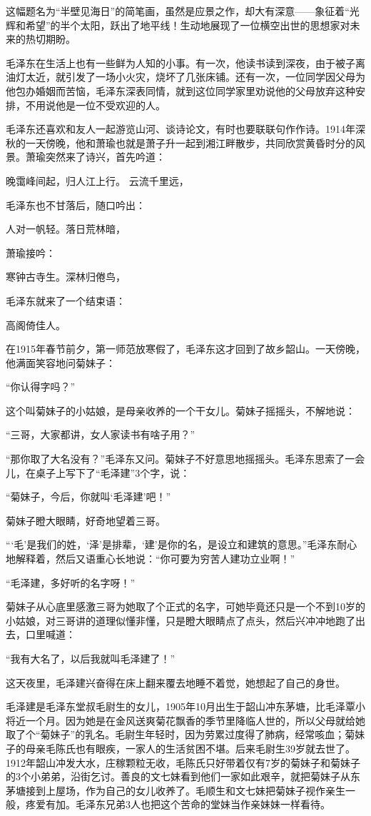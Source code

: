 \documentclass[../../dazhuan.tex]{subfiles}
\begin{document}
这幅题名为“半壁见海日”的简笔画，虽然是应景之作，却大有深意——象征着“光辉和希望”的半个太阳，跃出了地平线！生动地展现了一位横空出世的思想家对未来的热切期盼。

毛泽东在生活上也有一些鲜为人知的小事。有一次，他读书读到深夜，由于被子离油灯太近，就引发了一场小火灾，烧坏了几张床铺。还有一次，一位同学因父母为他包办婚姻而苦恼，毛泽东深表同情，就到这位同学家里劝说他的父母放弃这种安排，不用说他是一位不受欢迎的人。

毛泽东还喜欢和友人一起游览山河、谈诗论文，有时也要联联句作作诗。1914年深秋的一天傍晚，他和萧瑜也就是萧子升一起到湘江畔散步，共同欣赏黄昏时分的风景。萧瑜突然来了诗兴，首先吟道：

晚霭峰间起，归人江上行。 云流千里远，

毛泽东也不甘落后，随口吟出：

人对一帆轻。落日荒林暗，

萧瑜接吟：

寒钟古寺生。深林归倦鸟，

毛泽东就来了一个结束语：

高阁倚佳人。

在1915年春节前夕，第一师范放寒假了，毛泽东这才回到了故乡韶山。一天傍晚，他满面笑容地问菊妹子：

“你认得字吗？”

这个叫菊妹子的小姑娘，是母亲收养的一个干女儿。菊妹子摇摇头，不解地说：

“三哥，大家都讲，女人家读书有啥子用？”

“那你取了大名没有？”毛泽东又问。菊妹子不好意思地摇摇头。毛泽东思索了一会儿，在桌子上写下了“毛泽建”3个字，说：

“菊妹子，今后，你就叫‘毛泽建’吧！”

菊妹子瞪大眼睛，好奇地望着三哥。

“‘毛’是我们的姓，‘泽’是排辈，‘建’是你的名，是设立和建筑的意思。”毛泽东耐心地解释着，然后又语重心长地说：“你可要为穷苦人建功立业啊！”

“毛泽建，多好听的名字呀！”

菊妹子从心底里感激三哥为她取了个正式的名字，可她毕竟还只是一个不到10岁的小姑娘，对三哥讲的道理似懂非懂，只是瞪大眼睛点了点头，然后兴冲冲地跑了出去，口里喊道：

“我有大名了，以后我就叫毛泽建了！”

这天夜里，毛泽建兴奋得在床上翻来覆去地睡不着觉，她想起了自己的身世。

毛泽建是毛泽东堂叔毛尉生的女儿，1905年10月出生于韶山冲东茅塘，比毛泽覃小将近一个月。因为她是在金风送爽菊花飘香的季节里降临人世的，所以父母就给她取了个“菊妹子”的乳名。毛尉生年轻时，因为劳累过度得了肺病，经常咳血；菊妹子的母亲毛陈氏也有眼疾，一家人的生活贫困不堪。后来毛尉生39岁就去世了。1912年韶山冲发大水，庄稼颗粒无收，毛陈氏只好带着仅有7岁的菊妹子和菊妹子的3个小弟弟，沿街乞讨。善良的文七妹看到他们一家如此艰辛，就把菊妹子从东茅塘接到上屋场，作为自己的女儿收养了。毛顺生和文七妹把菊妹子视作亲生一般，疼爱有加。毛泽东兄弟3人也把这个苦命的堂妹当作亲妹妹一样看待。
\end{document}
